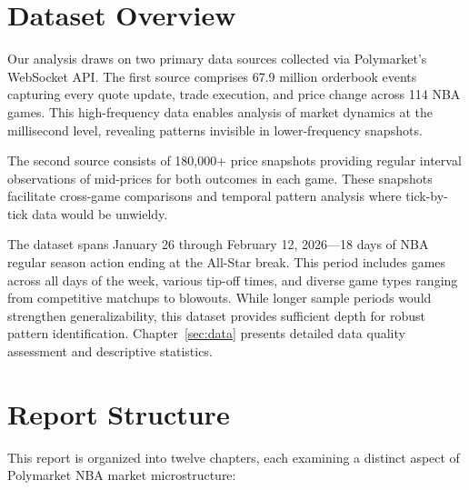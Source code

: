 \section{Dataset Overview}

Our analysis draws on two primary data sources collected via Polymarket's WebSocket API. The first source comprises 67.9 million orderbook events capturing every quote update, trade execution, and price change across 114 NBA games. This high-frequency data enables analysis of market dynamics at the millisecond level, revealing patterns invisible in lower-frequency snapshots.

The second source consists of 180,000+ price snapshots providing regular interval observations of mid-prices for both outcomes in each game. These snapshots facilitate cross-game comparisons and temporal pattern analysis where tick-by-tick data would be unwieldy.

The dataset spans January 26 through February 12, 2026---18 days of NBA regular season action ending at the All-Star break. This period includes games across all days of the week, various tip-off times, and diverse game types ranging from competitive matchups to blowouts. While longer sample periods would strengthen generalizability, this dataset provides sufficient depth for robust pattern identification. Chapter~\ref{sec:data} presents detailed data quality assessment and descriptive statistics.

\section{Report Structure}

This report is organized into twelve chapters, each examining a distinct aspect of Polymarket NBA market microstructure:

